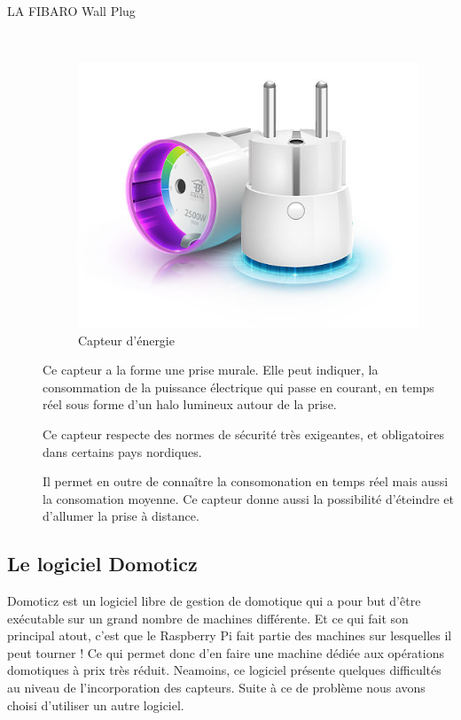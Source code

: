\begin{description}
\item[LA FIBARO Wall Plug] \hfill \\
\begin{figure}[h!]
	\center
	\includegraphics[scale=0.5]{./Images/jpg/WallPlug_FibaroDevice.jpg}
	\caption{Capteur d'énergie}
\end{figure}
Ce capteur a la forme une prise murale. Elle peut indiquer, la consommation de la puissance électrique qui passe en courant, en temps réel sous forme d'un halo lumineux autour de la prise.

Ce capteur respecte des normes de sécurité très exigeantes, et obligatoires dans certains pays nordiques.

Il permet en outre de connaître la consomonation en temps réel mais aussi la consomation moyenne. Ce capteur donne aussi la possibilité d'éteindre et d'allumer la prise à distance.

\end{description}



\subsection{Le logiciel Domoticz}
Domoticz est un logiciel libre de gestion de domotique qui a pour but d’être exécutable sur un grand nombre de machines différente. Et ce qui fait son principal atout, c’est que le Raspberry Pi fait partie des machines sur lesquelles il peut tourner ! Ce qui permet donc d’en faire une machine dédiée aux opérations domotiques à prix très réduit. 
Neamoins, ce logiciel présente quelques difficultés au niveau de l'incorporation des capteurs. Suite à ce de problème nous avons choisi d'utiliser un autre logiciel.

